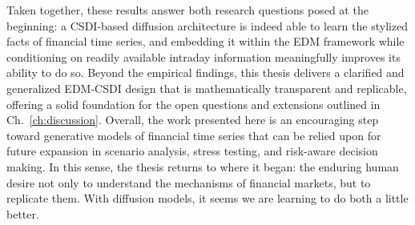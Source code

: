 Taken together, these results answer both research questions posed at the beginning: a CSDI-based diffusion architecture is indeed able to learn the stylized facts of financial time series, and embedding it within the EDM framework while conditioning on readily available intraday information meaningfully improves its ability to do so. Beyond the empirical findings, this thesis delivers a clarified and generalized EDM-CSDI design that is mathematically transparent and replicable, offering a solid foundation for the open questions and extensions outlined in Ch.\ \ref{ch:discussion}. Overall, the work presented here is an encouraging step toward generative models of financial time series that can be relied upon for future expansion in scenario analysis, stress testing, and risk-aware decision making. In this sense, the thesis returns to where it began: the enduring human desire not only to understand the mechanisms of financial markets, but to replicate them. With diffusion models, it seems we are learning to do both a little better.
